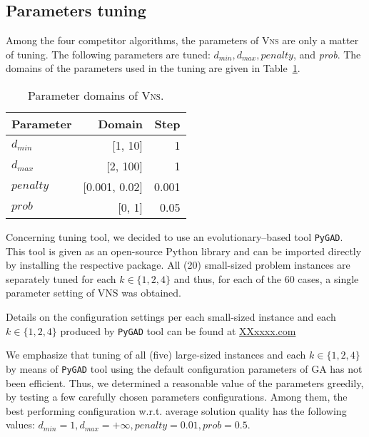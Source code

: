 \documentclass[dvipsnames,format=sigconf,anonymous=true,review=true]{acmart}
\begin{document}
\subsection{Parameters tuning}
   Among the four competitor algorithms, the parameters of \textsc{Vns} are only a matter of tuning. The following parameters are tuned: $d_{min}, d_{max}, penalty$, and \emph{prob}.  The domains of the parameters used in the tuning are given in Table~\ref{tab:domain_tuning}.
   
    \begin{table}[ht]
    	\caption{Parameter domains of \textsc{Vns}.}  
    	\label{tab:domain_tuning}
   	\begin{tabular}{lrr}
    Parameter       & Domain & Step \\ \hline
   	$d_{min}$  &  [1, 10] & 1 \\
   	$d_{max}$  & [2, 100] & 1\\
   	 $penalty$ & [0.001, 0.02]  & 0.001 \\
   	 $prob$    & [0, 1] & 0.05 \\ \hline
   	\end{tabular}
   \end{table}
   
   Concerning tuning tool, we decided to use an evolutionary--based tool \texttt{PyGAD}. This tool is given as an open-source Python library and can be imported directly by installing the respective package. All (20) small-sized problem instances are separately tuned for each $k\in \{1, 2, 4\}$ and thus, for each of the 60 cases, a single parameter setting of VNS was obtained. 
  
    
     Details on the configuration settings per each small-sized instance and each $k\in \{1, 2, 4\}$ produced by \texttt{PyGAD} tool can be found at \url{XXxxxx.com}
     
     We emphasize that tuning of all (five) large-sized instances and each $k \in \{1,2,4\}$  by means of \texttt{PyGAD} tool using the default configuration parameters of GA has not been efficient. Thus, we determined a reasonable  value of the parameters  greedily, by testing a few carefully chosen parameters configurations. Among them, the best performing configuration w.r.t. average solution quality has the following values: $d_{min}=1, d_{max} = + \infty, penalty = 0.01, prob=0.5$. 
\end{document}
